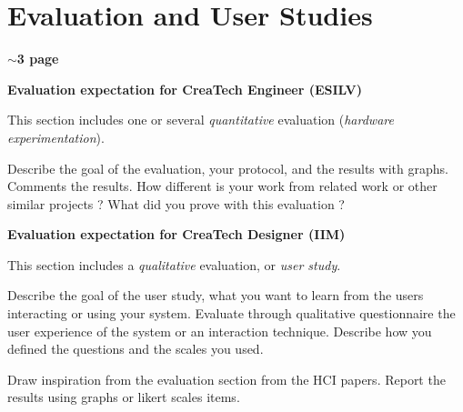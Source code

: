 

\section*{Evaluation and User Studies }
\textbf{$\sim$3 page}







\textbf{Evaluation expectation for CreaTech Engineer (ESILV)}

 This section includes one or several \textit{quantitative} evaluation (\textit{hardware experimentation}). 
 
 Describe the goal of the evaluation, your protocol, and the results with graphs. Comments the results. How different is your work from related work or other similar projects ? What did you prove with this evaluation ? 
 
\textbf{Evaluation expectation for CreaTech Designer (IIM)}

 This section includes a  \textit{qualitative} evaluation, or  \textit{user study}. 
 
 Describe the goal of the user study, what you want to learn from the users interacting or using your system. Evaluate through qualitative questionnaire the user experience of the system or an interaction technique. Describe how you defined the questions and the scales you used. 

Draw inspiration from the evaluation section from the HCI papers. Report the results using graphs or likert scales items. 
